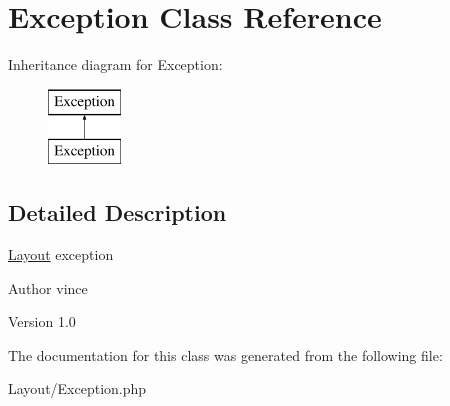 \hypertarget{class_anemo_1_1_layout_1_1_exception}{
\section{Exception Class Reference}
\label{class_anemo_1_1_layout_1_1_exception}
}
Inheritance diagram for Exception:\begin{figure}[H]
\begin{center}
\leavevmode
\includegraphics[height=2.000000cm]{class_anemo_1_1_layout_1_1_exception}
\end{center}
\end{figure}


\subsection{Detailed Description}
\hyperlink{class_anemo_1_1_layout}{Layout} exception \begin{DoxyAuthor}{Author}
vince 
\end{DoxyAuthor}
\begin{DoxyVersion}{Version}
1.0 
\end{DoxyVersion}


The documentation for this class was generated from the following file:\begin{DoxyCompactItemize}
\item 
Layout/Exception.php\end{DoxyCompactItemize}
